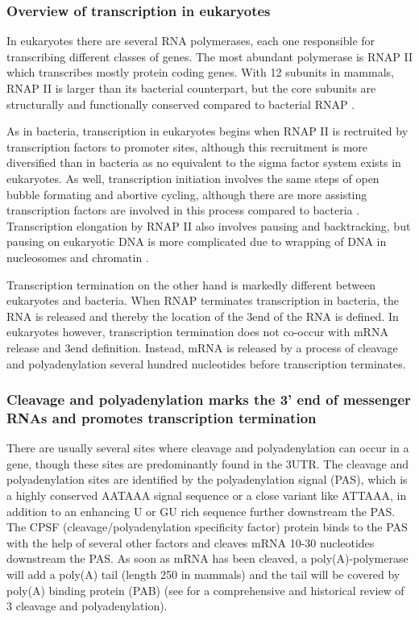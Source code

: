 %
\subsubsection{Overview of transcription in eukaryotes}
In eukaryotes there are several RNA polymerases, each one responsible for
transcribing different classes of genes. The most abundant polymerase is 
RNAP II which transcribes mostly protein coding genes. With 12 subunits in
mammals, RNAP II is larger than its bacterial counterpart, but the core
subunits are structurally and functionally conserved compared to bacterial RNAP
\cite{ebright_rna_2000}.

As in bacteria, transcription in eukaryotes begins when RNAP II is rectruited by
transcription factors to promoter sites, although this recruitment is more
diversified than in bacteria as no equivalent to the sigma factor system
exists in eukaryotes. As well, transcription initiation involves the same steps
of open bubble formating and abortive cycling, although there are more
assisting transcription factors are involved in this process compared to
bacteria \cite{wade_transition_2008}. Transcription elongation by RNAP II also
involves pausing and backtracking, but pausing on eukaryotic DNA is more
complicated due to wrapping of DNA in nucleosomes and chromatin
\cite{sims_elongation_2004}.

Transcription termination on the other hand is markedly different between
eukaryotes and bacteria. When RNAP terminates transcription in bacteria, the
RNA is released and thereby the location of the 3\p end of the RNA is defined.
In eukaryotes however, transcription termination does not co-occur with mRNA
release and 3\p end definition. Instead, mRNA is released by a process of
cleavage and polyadenylation several hundred nucleotides before transcription
terminates.

\subsubsection{Cleavage and polyadenylation marks the 3' end of messenger RNAs
and promotes transcription termination}
There are usually several sites where cleavage and polyadenylation can occur in
a gene, though these sites are predominantly found in the 3\p UTR. The cleavage
and polyadenylation sites are identified by the polyadenylation signal (PAS),
which is a highly conserved AATAAA signal sequence or a close variant like
ATTAAA, in addition to an enhancing U or GU rich sequence further downstream
the PAS. The CPSF (cleavage/polyadenylation specificity factor) protein binds
to the PAS with the help of several other factors and cleaves mRNA 10-30
nucleotides downstream the PAS. As soon as mRNA has been cleaved, a
poly(A)-polymerase will add a poly(A) tail (length 250 in mammals) and the tail
will be covered by poly(A) binding protein (PAB) (see
\cite{proudfoot_ending_2011} for a comprehensive and historical review of 3\p
cleavage and polyadenylation).


